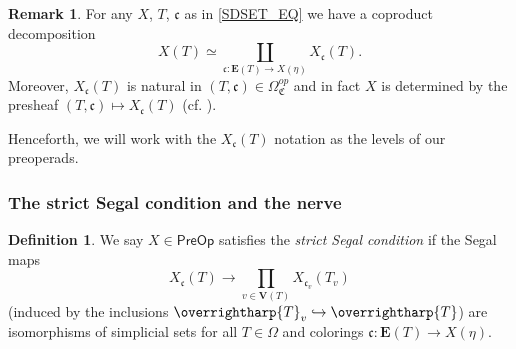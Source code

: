 \documentclass[a4paper,10pt
,draft
]{article}%
\numberwithin{equation}{section}
\numberwithin{figure}{section}
\newtheorem{proposition}[equation]{Proposition}%
\theoremstyle{definition} %
\newtheorem{definition}[equation]{Definition}%
\newtheorem{remark}[equation]{Remark}%
\newcommand{\vect}[1]{\text{\overrightharp{\ensuremath{#1}}}}
\newcommand{\sSet}{\ensuremath{\mathsf{sSet}}}%
\newcommand{\PreOp}{\mathsf{PreOp}}
\newcommand{\Fun}{\mathsf{Fun}}
\newcommand{\1}{\ensuremath{\mathbbm 1}}%
\begin{document}
\begin{remark}
        For any $X$, $T$, $\mathfrak c$ as in \eqref{SDSET_EQ} %
        we have a coproduct decomposition \cite[Eq. \eqref{TAS-COLDEC_EQ}]{BP_TAS}
        \begin{equation}
                \label{COLDEC_EQ}
                X(T) \simeq \coprod_{\mathfrak c \colon \boldsymbol{E}(T) \to X(\eta)} X_{\mathfrak c}(T).
        \end{equation}
        Moreover, $X_{\mathfrak c}(T)$ is natural in $(T, \mathfrak c) \in \Omega_{\mathfrak C}^{op}$
        and in fact
        $X$ is determined by the presheaf $(T, \mathfrak c) \mapsto X_{\mathfrak c}(T)$
        (cf. \cite[Eq. \eqref{TAS-PREOPCOLFIXEQ EQ}]{BP_TAS}).
        
        Henceforth, we will work with the $X_{\mathfrak c}(T)$ notation as the levels of our preoperads.
\end{remark}

\subsubsection*{The strict Segal condition and the nerve}


\begin{definition}
        \label{SSC_DEF}
        We say $X \in \PreOp$ satisfies the \textit{strict Segal condition} if
        the Segal maps
        \[
                X_{\mathfrak c}(T) \to \prod_{v \in \boldsymbol{V}(T)} X_{\mathfrak c_v}(T_v)
        \]
        (induced by the inclusions $\vect T_v \hookrightarrow \vect T$)
        are isomorphisms of simplicial sets
        for all $T \in \Omega$ and colorings $\mathfrak c \colon \boldsymbol{E}(T) \to X(\eta)$.
\end{definition}
\end{document}
